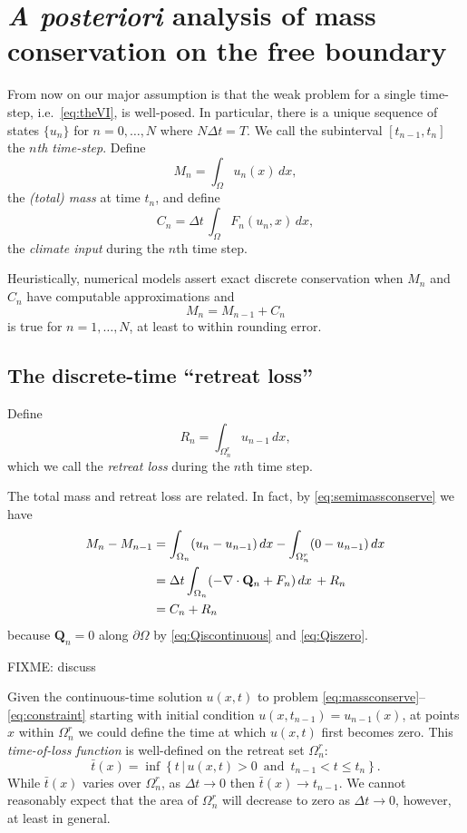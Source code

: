 \documentclass[final,leqno,onefignum,onetabnum]{siamltex1213bueler}
\newcommand\bQ{\mathbf{Q}}
\newcommand{\Div}{\nabla\cdot}
\begin{document}
\section{\emph{A posteriori} analysis of mass conservation on the free boundary}  \label{sec:timeseries}

From now on our major assumption is that the weak problem for a single time-step, i.e.~\eqref{eq:theVI}, is well-posed.  In particular, there is a unique sequence of states $\{u_n\}$ for $n=0,\dots,N$ where $N\Delta t = T$.  We call the subinterval $[t_{n-1},t_n]$ the \emph{$n$th time-step}.  Define
\begin{equation}
M_n = \int_\Omega u_n(x)\,dx, \label{eq:totalmassseries}
\end{equation}
the \emph{(total) mass} at time $t_n$, and define
\begin{equation}
C_n = \Delta t\, \int_\Omega F_n(u_n,x)\,dx, \label{eq:climateseries}
\end{equation}
the \emph{climate input} during the $n$th time step.

Heuristically, numerical models assert exact discrete conservation when $M_n$ and $C_n$ have computable approximations and
	$$M_n = M_{n-1} + C_n$$
is true for $n=1,\dots,N$, at least to within rounding error.

\subsection{The discrete-time ``retreat loss''}  \label{subsec:retreatloss}  Define
\begin{equation}
R_n = \int_{\Omega_n^r} u_{n-1}\,dx, \label{eq:retreatlossseries}
\end{equation}
which we call the \emph{retreat loss} during the $n$th time step.

The total mass and retreat loss are related.  In fact, by \eqref{eq:semimassconserve} we have
\begin{align}
M_n - M_{n-1} &= \int_{\Omega_n} (u_n - u_{n-1})\,dx - \int_{\Omega_n^r} (0 - u_{n-1})\,dx \label{eq:massstep} \\
   &= \Delta t \int_{\Omega_n} (- \Div \bQ_n + F_n) \,dx \, + R_n \notag \\
   &= C_n + R_n \notag
\end{align}
because $\bQ_n=0$ along $\partial \Omega$ by \eqref{eq:Qiscontinuous} and \eqref{eq:Qiszero}.

FIXME: discuss

Given the continuous-time solution $u(x,t)$ to problem \eqref{eq:massconserve}--\eqref{eq:constraint} starting with initial condition $u(x,t_{n-1}) = u_{n-1}(x)$, at points $x$ within $\Omega_n^r$ we could define the time at which $u(x,t)$ first becomes zero.  This \emph{time-of-loss function} is well-defined on the retreat set $\Omega_n^r$:
\begin{equation}
\bar t(x) = \inf\left\{t \,\big|\, u(x,t)>0 \,\text{ and }\, t_{n-1} < t \le t_n\right\}.
\end{equation}
While $\bar t(x)$ varies over $\Omega_n^r$, as $\Delta t \to 0$ then $\bar t(x) \to t_{n-1}$.  We cannot reasonably expect that the area of $\Omega_n^r$ will decrease to zero as $\Delta t \to 0$, however, at least in general.
\end{document}
